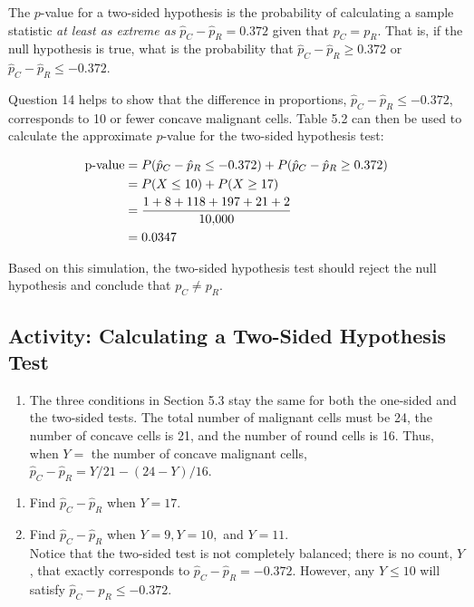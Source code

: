 \documentclass[
]{book}
\providecommand{\tightlist}{%
  \setlength{\itemsep}{0pt}\setlength{\parskip}{0pt}}
\begin{document}
The \(p\)-value for a two-sided hypothesis is the probability of calculating a sample statistic \emph{at least as extreme as} \(\hat p_C - \hat p_R = 0.372\) given that \(p_C = p_R\). That is, if the null hypothesis is true, what is the probability that \(\hat p_C - \hat p_R \ge 0.372\) or \(\hat p_C - \hat p_R \le -0.372\).

Question 14 helps to show that the difference in proportions, \(\hat p_C - \hat p_R \le -0.372\), corresponds to 10 or fewer concave malignant cells. Table 5.2 can then be used to calculate the approximate \(p\)-value for the two-sided hypothesis test:

\begin{align}
\text{p-value}
&= P(\hat p_C - \hat p_R \le -0.372) + P(\hat p_C - \hat p_R \ge 0.372) \notag \\ \notag
&= P(X \le 10) + P(X \ge 17) \\ \notag 
&= \frac{1 + 8 + 118 + 197 + 21 + 2}{10{,}000} \\ \notag
&= 0.0347 \notag
\end{align}

Based on this simulation, the two-sided hypothesis test should reject the null hypothesis and conclude that \(p_C \neq p_R\).

\hypertarget{activity-calculating-a-two-sided-hypothesis-test}{%
\subsection*{Activity: Calculating a Two-Sided Hypothesis Test}\label{activity-calculating-a-two-sided-hypothesis-test}}

\begin{enumerate}
\def\labelenumi{\arabic{enumi}.}
\setcounter{enumi}{13}
\tightlist
\item
  The three conditions in Section 5.3 stay the same for both the one-sided and the two-sided tests. The total number of malignant cells must be 24, the number of concave cells is 21, and the number of round cells is 16. Thus, when \(Y =\) the number of concave malignant cells, \(\hat p_C - \hat p_R = Y/21 - (24 - Y)/16\).\\
\end{enumerate}

\begin{enumerate}
\def\labelenumi{\alph{enumi}.}
\tightlist
\item
  Find \(\hat p_C - \hat p_R\) when \(Y = 17\).\\
\item
  Find \(\hat p_C - \hat p_R\) when \(Y = 9, Y = 10,\) and \(Y = 11\).\\
  Notice that the two-sided test is not completely balanced; there is no count, \(Y\), that exactly corresponds to \(\hat p_C - \hat p_R = -0.372\). However, any \(Y \le 10\) will satisfy \(\hat p_C - \hat p_R \le -0.372\).
\end{enumerate}
\end{document}
